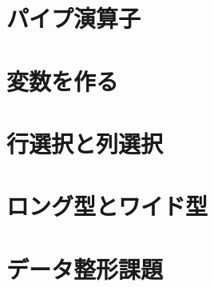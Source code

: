 \documentclass[
  a4paper,
]{ltjsbook}
\begin{document}
\hypertarget{ux30d1ux30a4ux30d7ux6f14ux7b97ux5b50-5}{%
\section{パイプ演算子}\label{ux30d1ux30a4ux30d7ux6f14ux7b97ux5b50-5}}

\hypertarget{ux5909ux6570ux3092ux4f5cux308b-5}{%
\section{変数を作る}\label{ux5909ux6570ux3092ux4f5cux308b-5}}

\hypertarget{ux884cux9078ux629eux3068ux5217ux9078ux629e-5}{%
\section{行選択と列選択}\label{ux884cux9078ux629eux3068ux5217ux9078ux629e-5}}

\hypertarget{ux30edux30f3ux30b0ux578bux3068ux30efux30a4ux30c9ux578b-5}{%
\section{ロング型とワイド型}\label{ux30edux30f3ux30b0ux578bux3068ux30efux30a4ux30c9ux578b-5}}

\hypertarget{ux30c7ux30fcux30bfux6574ux5f62ux8ab2ux984c-5}{%
\section{データ整形課題}\label{ux30c7ux30fcux30bfux6574ux5f62ux8ab2ux984c-5}}


\printbibliography
\end{document}

